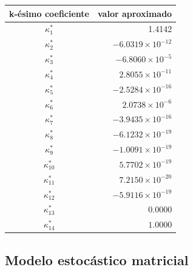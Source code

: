 \begin{center}
\begin{tabular}{|c|r|}
    \hline
    k-ésimo coeficiente & \multicolumn{1}{c|}{valor aproximado}\\\hline\hline
    $\kappa_1^*$ & 1.4142  \\
    $\kappa_2^*$ & $-6.0319\times 10^{-12}$ \\
    $\kappa_3^*$ & $-6.8060\times 10^{-5}$ \\
    $\kappa_4^*$ & $2.8055\times 10^{-11}$ \\
    $\kappa_5^*$ & $-2.5284\times 10^{-16}$ \\
    $\kappa_6^*$ & $2.0738\times 10^{-6}$ \\
    $\kappa_7^*$ & $-3.9435\times 10^{-16}$ \\
    $\kappa_8^*$ & $-6.1232\times 10^{-19}$ \\
    $\kappa_9^*$ &  $-1.0091\times 10^{-19}$ \\
    $\kappa_{10}^*$ & $5.7702\times 10^{-19}$ \\
    $\kappa_{11}^*$ & $7.2150\times 10^{-20}$ \\
    $\kappa_{12}^*$ & $-5.9116\times 10^{-19}$ \\
    $\kappa_{13}^*$ & $0.0000$ \\
    $\kappa_{14}^*$ & $1.0000$ \\
    \hline
\end{tabular}
\label{tabladecoeficientes2}
\end{center}

\subsection{Modelo estocástico matricial}
